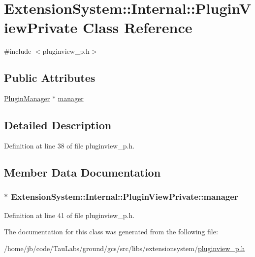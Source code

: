 \hypertarget{class_extension_system_1_1_internal_1_1_plugin_view_private}{\section{\-Extension\-System\-:\-:\-Internal\-:\-:\-Plugin\-View\-Private \-Class \-Reference}
\label{class_extension_system_1_1_internal_1_1_plugin_view_private}
}


{\ttfamily \#include $<$pluginview\-\_\-p.\-h$>$}

\subsection*{\-Public \-Attributes}
\begin{DoxyCompactItemize}
\item 
\hyperlink{class_extension_system_1_1_plugin_manager}{\-Plugin\-Manager} $\ast$ \hyperlink{class_extension_system_1_1_internal_1_1_plugin_view_private_ae2536bd8dab81cd1ae84cf4973b79f7f}{manager}
\end{DoxyCompactItemize}


\subsection{\-Detailed \-Description}


\-Definition at line 38 of file pluginview\-\_\-p.\-h.



\subsection{\-Member \-Data \-Documentation}
\hypertarget{class_extension_system_1_1_internal_1_1_plugin_view_private_ae2536bd8dab81cd1ae84cf4973b79f7f}{
\subsubsection[{manager}]{$\ast$ {\bf \-Extension\-System\-::\-Internal\-::\-Plugin\-View\-Private\-::manager}}}\label{class_extension_system_1_1_internal_1_1_plugin_view_private_ae2536bd8dab81cd1ae84cf4973b79f7f}


\-Definition at line 41 of file pluginview\-\_\-p.\-h.



\-The documentation for this class was generated from the following file\-:\begin{DoxyCompactItemize}
\item 
/home/jb/code/\-Tau\-Labs/ground/gcs/src/libs/extensionsystem/\hyperlink{pluginview__p_8h}{pluginview\-\_\-p.\-h}\end{DoxyCompactItemize}

